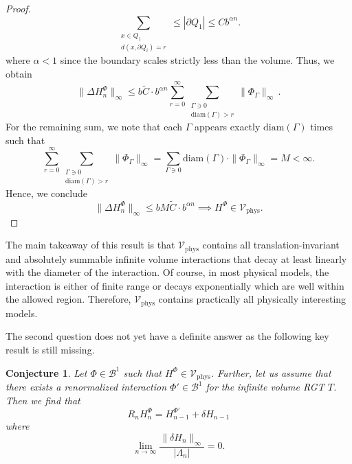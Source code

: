 \documentclass{article}
\newtheorem{conjecture}[theorem]{Conjecture}
\newcommand{\diam}{\mathrm{diam}}
\newcommand{\phys}{\mathrm{phys}}
\begin{document}
\begin{proof}
    \begin{equation}
        \sum_{\substack{x\in Q_1\\d(x,\partial Q_i)=r}}\leq|\partial Q_1|\leq Cb^{\alpha n}.
    \end{equation}
    where $\alpha<1$ since the boundary scales strictly less than the volume. Thus, we obtain
    \begin{equation}
        \|\Delta H_n^\Phi\|_\infty\leq b\tilde C\cdot b^{\alpha n}\sum_{r=0}^\infty\sum_{\substack{\Gamma\ni0\\\diam(\Gamma)>r}}\|\Phi_\Gamma\|_\infty\,.
    \end{equation}
    For the remaining sum, we note that each $\Gamma$ appears exactly $\diam(\Gamma)$ times such that
    \begin{equation}
        \sum_{r=0}^\infty\sum_{\substack{\Gamma\ni0\\\diam(\Gamma)>r}}\|\Phi_\Gamma\|_\infty=\sum_{\Gamma\ni0}\diam(\Gamma)\cdot\|\Phi_\Gamma\|_\infty=M<\infty.
    \end{equation}
    Hence, we conclude
    \begin{equation}
        \|\Delta H_n^\Phi\|_\infty\leq bM\tilde C\cdot b^{\alpha n}\implies H^\Phi\in \mathcal{V}_\phys.
    \end{equation}
\end{proof}

The main takeaway of this result is that $\mathcal{V}_\phys$ contains all translation-invariant and absolutely summable infinite volume interactions that decay at least linearly with the diameter of the interaction. Of course, in most physical models, the interaction is either of finite range or decays exponentially which are well within the allowed region. Therefore, $\mathcal{V}_\phys$ contains practically all physically interesting models.\smallskip

The second question does not yet have a definite answer as the following key result is still missing.

\begin{conjecture}\label{Conj1}
    Let $\Phi\in\mathcal{B}^1$ such that $H^\Phi\in \mathcal{V}_\phys$. Further, let us assume that there exists a renormalized interaction $\Phi'\in\mathcal{B}^1$ for the infinite volume RGT $T$. Then we find that
    \begin{equation}
        R_nH_n^\Phi=H_{n-1}^{\Phi'}+\delta H_{n-1}
    \end{equation}
    where
    \begin{equation}
        \lim_{n\to\infty}\frac{\|\delta H_n\|_\infty}{|\Lambda_n|}=0.
    \end{equation}
\end{conjecture}
\end{document}
